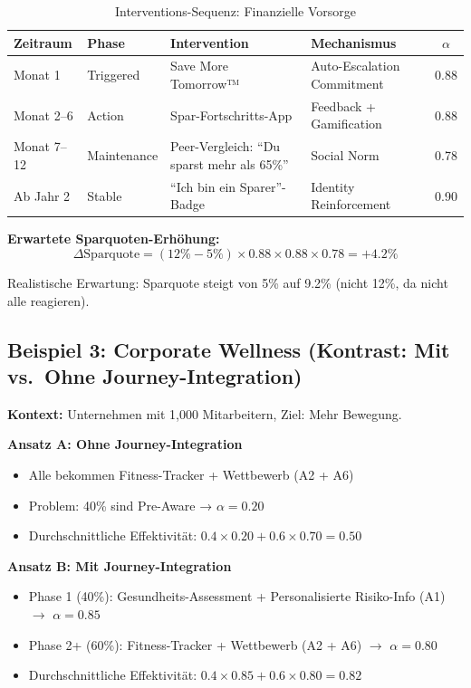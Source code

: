 \begin{table}[htbp]
\centering
\caption{Interventions-Sequenz: Finanzielle Vorsorge}
\label{tab:18-example-finance}
\renewcommand{\arraystretch}{1.3}
\small
\begin{tabular}{@{}llllc@{}}
\toprule
\textbf{Zeitraum} & \textbf{Phase} & \textbf{Intervention} & \textbf{Mechanismus} & \textbf{$\alpha$} \\
\midrule
Monat 1 & Triggered & Save More Tomorrow™ & Auto-Escalation Commitment & 0.88 \\
Monat 2--6 & Action & Spar-Fortschritts-App & Feedback + Gamification & 0.88 \\
Monat 7--12 & Maintenance & Peer-Vergleich: ``Du sparst mehr als 65\%'' & Social Norm & 0.78 \\
Ab Jahr 2 & Stable & ``Ich bin ein Sparer''-Badge & Identity Reinforcement & 0.90 \\
\bottomrule
\end{tabular}
\end{table}

\textbf{Erwartete Sparquoten-Erhöhung:}
\begin{equation}
\Delta \text{Sparquote} = (12\% - 5\%) \times 0.88 \times 0.88 \times 0.78 = +4.2\%
\label{eq:18-finance-effect}
\end{equation}

Realistische Erwartung: Sparquote steigt von 5\% auf 9.2\% (nicht 12\%, da nicht alle reagieren).

\subsection{Beispiel 3: Corporate Wellness (Kontrast: Mit vs.\ Ohne Journey-Integration)}

\textbf{Kontext:} Unternehmen mit 1,000 Mitarbeitern, Ziel: Mehr Bewegung.

\textbf{Ansatz A: Ohne Journey-Integration}
\begin{itemize}
\item Alle bekommen Fitness-Tracker + Wettbewerb (A2 + A6)
\item Problem: 40\% sind Pre-Aware → $\alpha = 0.20$
\item Durchschnittliche Effektivität: $0.4 \times 0.20 + 0.6 \times 0.70 = 0.50$
\end{itemize}

\textbf{Ansatz B: Mit Journey-Integration}
\begin{itemize}
\item Phase 1 (40\%): Gesundheits-Assessment + Personalisierte Risiko-Info (A1) $\rightarrow$ $\alpha = 0.85$
\item Phase 2+ (60\%): Fitness-Tracker + Wettbewerb (A2 + A6) $\rightarrow$ $\alpha = 0.80$
\item Durchschnittliche Effektivität: $0.4 \times 0.85 + 0.6 \times 0.80 = 0.82$
\end{itemize}

